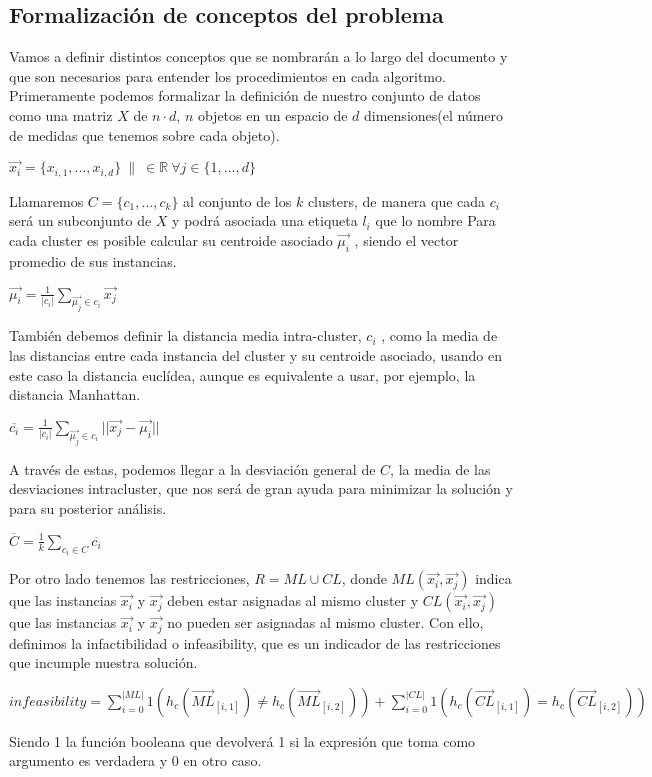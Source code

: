 \documentclass{article}
\providecommand{\abs}[1]{\lvert#1\rvert}
\begin{document}
	\subsection{Formalización de conceptos del problema}
	Vamos a definir distintos conceptos que se nombrarán a lo largo del documento y que son
	necesarios para entender los procedimientos en cada algoritmo.
	Primeramente podemos formalizar la definición de nuestro conjunto de datos como una matriz $X$ de
	$n\cdot d$, $n$ objetos en un espacio de $d$ dimensiones(el número de medidas que tenemos sobre cada
	objeto).\par
	{\centering $\vec{x_i} =\{x_{i,1},...,x_{i,d}\}\ \| \ \in \mathbb R\ \forall j\in \{1,...,d\}$\par}
	Llamaremos $C=\{c_1,...,c_k\}$ al conjunto de los $k$ clusters, de manera que cada $c_i$ será un subconjunto
	de $X$ y podrá asociada una etiqueta $l_i$ que lo nombre Para cada cluster es posible calcular su
	centroide asociado $\vec{\mu_i} $ , siendo el vector promedio de sus instancias.\par
	{\centering $\vec{\mu_i} = \frac{1}{\abs{c_i}} \displaystyle\sum_{\vec{\mu_j} \in c_i} \vec{x_j}$\par}
	También debemos definir la distancia media intra-cluster, $c_i$ , como la media de las distancias
	entre cada instancia del cluster y su centroide asociado, usando en este caso la distancia euclídea,
	aunque es equivalente a usar, por ejemplo, la distancia Manhattan.\par
	{\centering ${\overline{c_i}} = \frac{1}{\abs{c_i}} \displaystyle\sum_{\vec{\mu_j} \in c_i} \abs{\abs{\vec{x_j}-\vec{\mu_i}}} $\par}
	A través de estas, podemos llegar a la desviación general de $C$, la media de las desviaciones intracluster,
	que nos será de gran ayuda para minimizar la solución y para su posterior análisis.\par
	{\centering ${\overline{C}} = \frac{1}{k} \displaystyle\sum_{c_i \in C} \overline{c_i}$\par}
	Por otro lado tenemos las restricciones, $R=ML\cup CL$, donde $ML(\vec{x_i},\vec{x_j})$ indica que las
	instancias $\vec{x_i}$ y $\vec{x_j}$ deben estar asignadas al mismo cluster y $CL(\vec{x_i},\vec{x_j})$ que las instancias
	$\vec{x_i}$ y $\vec{x_j}$ no pueden ser asignadas al mismo cluster. Con ello, definimos la infactibilidad o
	infeasibility, que es un indicador de las restricciones que incumple nuestra solución.\par
	{\centering $infeasibility=\displaystyle\sum_{i=0}^{\abs{ML}}1(h_c(\vec{ML}_{[i,1]})\neq h_c(\vec{ML}_{[i,2]}))+\displaystyle\sum_{i=0}^{\abs{CL}}1(h_c(\vec{CL}_{[i,1]})=h_c(\vec{CL}_{[i,2]}))$\par}
	Siendo 1 la función booleana que devolverá 1 si la expresión que toma como argumento es verdadera y 0 en otro caso.
	
\end{document}
